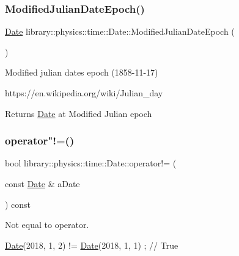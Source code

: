 \subsubsection{\texorpdfstring{Modified\+Julian\+Date\+Epoch()}{ModifiedJulianDateEpoch()}}
{\footnotesize\ttfamily \hyperlink{classlibrary_1_1physics_1_1time_1_1_date}{Date} library\+::physics\+::time\+::\+Date\+::\+Modified\+Julian\+Date\+Epoch (\begin{DoxyParamCaption}{ }\end{DoxyParamCaption})\hspace{0.3cm}{\ttfamily [static]}}



Modified julian dates epoch (1858-\/11-\/17) 

https\+://en.wikipedia.\+org/wiki/\+Julian\+\_\+day

\begin{DoxyReturn}{Returns}
\hyperlink{classlibrary_1_1physics_1_1time_1_1_date}{Date} at Modified Julian epoch 
\end{DoxyReturn}
\mbox{\label{classlibrary_1_1physics_1_1time_1_1_date_aaea5c9cb4cd6fd707f86008320533a2d}} 
\subsubsection{\texorpdfstring{operator"!=()}{operator!=()}}
{\footnotesize\ttfamily bool library\+::physics\+::time\+::\+Date\+::operator!= (\begin{DoxyParamCaption}\item[{const \hyperlink{classlibrary_1_1physics_1_1time_1_1_date}{Date} \&}]{a\+Date }\end{DoxyParamCaption}) const}



Not equal to operator. 


\begin{DoxyCode}
\hyperlink{classlibrary_1_1physics_1_1time_1_1_date_a08e7d804b40b1bfaacbccd32cf79f292}{Date}(2018, 1, 2) != \hyperlink{classlibrary_1_1physics_1_1time_1_1_date_a08e7d804b40b1bfaacbccd32cf79f292}{Date}(2018, 1, 1) ; \textcolor{comment}{// True}
\end{DoxyCode}



